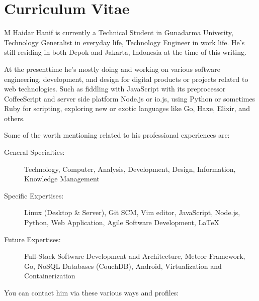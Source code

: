 \cleardoublepage
{}

\thispagestyle{empty}

\chapter*{Curriculum Vitae}
\label{chap:cv}

\begin{figure}[htb]
    \centering
    \label{fig:cv:mhaidarhanif}
\end{figure}

M Haidar Hanif is currently a Technical Student in Gunadarma Univerity, Technology Generalist in everyday life, Technology Engineer in work life.
He's still residing in both Depok and Jakarta, Indonesia at the time of this writing.

At the presenttime he's mostly doing and working on various software engineering, development, and design for digital products or projects related to web technologies.
Such as fiddling with JavaScript with its preprocessor CoffeeScript and server side platform Node.js or io.js, using Python or sometimes Ruby for scripting, exploring new or exotic languages like Go, Haxe, Elixir, and others.

\noindent Some of the worth mentioning related to his professional experiences are:

\begin{description}
  \item [General Specialties:] Technology, Computer, Analysis, Development, Design, Information, Knowledge Management
  \item [Specific Expertises:] Linux (Desktop \& Server), Git SCM, Vim editor, JavaScript, Node.js, Python, Web Application, Agile Software Development, LaTeX
  \item [Future Expertises:] Full-Stack Software Development and Architecture, Meteor Framework, Go, NoSQL Databases (CouchDB), Android, Virtualization and Containerization
\end{description}

\noindent You can contact him via these various ways and profiles:

